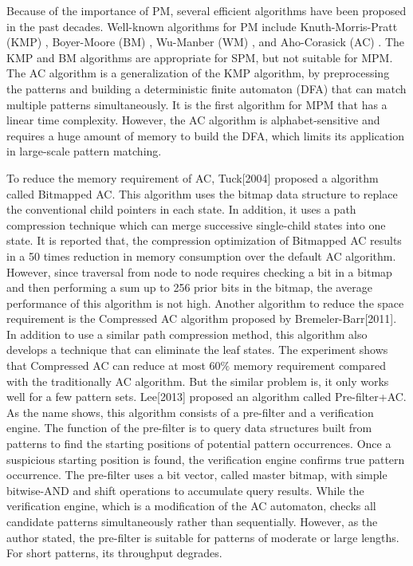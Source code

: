 \documentclass{article}
\begin{document}
Because of the importance of PM, several efficient algorithms have
been proposed in the past decades. Well-known algorithms for PM
include Knuth-Morris-Pratt (\textsf{KMP}) \cite{Knuth1977},
Boyer-Moore (\textsf{BM}) \cite{Boyer1977}, Wu-Manber (\textsf{WM})
\cite{Wu1994}, and Aho-Corasick (\textsf{AC}) \cite{Aho1975}. The
\textsf{KMP} and \textsf{BM} algorithms are appropriate for SPM, but
not suitable for MPM. The \textsf{AC} algorithm is a generalization of
the \textsf{KMP} algorithm, by preprocessing the patterns and building
a deterministic finite automaton (DFA) that can match multiple
patterns simultaneously. It is the first algorithm for MPM that has a
linear time complexity. However, the \textsf{AC} algorithm is
alphabet-sensitive and requires a huge amount of memory to build the
DFA, which limits its application in large-scale pattern matching.

To reduce the memory requirement of \textsf{AC}, Tuck[2004] proposed a
algorithm called \textsf{Bitmapped AC}. This algorithm uses the bitmap
data structure to replace the conventional child pointers in each
state. In addition, it uses a path compression technique which can
merge successive single-child states into one state. It is reported
that, the compression optimization of \textsf{Bitmapped AC} results in
a 50 times reduction in memory consumption over the default
\textsf{AC} algorithm. However, since traversal from node to node
requires checking a bit in a bitmap and then performing a sum up to
256 prior bits in the bitmap, the average performance of this
algorithm is not high.  Another algorithm to reduce the space
requirement is the \textsf{Compressed AC} algorithm proposed by
Bremeler-Barr[2011]. In addition to use a similar path compression
method, this algorithm also develops a technique that can eliminate
the leaf states. The experiment shows that \textsf{Compressed AC} can
reduce at most $60\%$ memory requirement compared with the
traditionally \textsf{AC} algorithm. But the similar problem is, it
only works well for a few pattern sets.  Lee[2013] proposed an
algorithm called \textsf{Pre-filter+AC}. As the name shows, this
algorithm consists of a pre-filter and a verification engine. The
function of the pre-filter is to query data structures built from
patterns to find the starting positions of potential pattern
occurrences. Once a suspicious starting position is found, the
verification engine confirms true pattern occurrence. The pre-filter
uses a bit vector, called master bitmap, with simple bitwise-AND and
shift operations to accumulate query results. While the verification
engine, which is a modification of the AC automaton, checks all
candidate patterns simultaneously rather than sequentially. However,
as the author stated, the pre-filter is suitable for patterns of
moderate or large lengths. For short patterns, its throughput
degrades.
\end{document}
